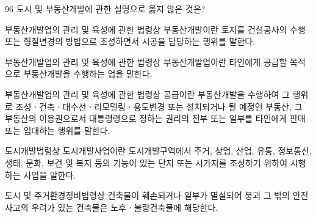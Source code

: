 \begin{question}{96}
도시 및 부동산개발에 관한 설명으로 옳지 않은 것은?
\begin{choices}
  \item 부동산개발업의 관리 및 육성에 관한 법령상 부동산개발이란 토지를 건설공사의 수행 또는 형질변경의 방법으로 조성하면서 시공을 담당하는 행위를 말한다.
  \item 부동산개발업의 관리 및 육성에 관한 법령상 부동산개발업이란 타인에게 공급할 목적으로 부동산개발을 수행하는 업을 말한다.
  \item 부동산개발업의 관리 및 육성에 관한 법령상 공급이란 부동산개발을 수행하여 그 행위로 조성ㆍ건축ㆍ대수선ㆍ리모델링ㆍ용도변경 또는 설치되거나 될 예정인 부동산, 그 부동산의 이용권으로서 대통령령으로 정하는 권리의 전부 또는 일부를 타인에게 판매 또는 임대하는 행위를 말한다.
  \item 도시개발법령상 도시개발사업이란 도시개발구역에서 주거, 상업, 산업, 유통, 정보통신, 생태, 문화, 보건 및 복지 등의 기능이 있는 단지 또는 시가지를 조성하기 위하여 시행하는 사업을 말한다.
  \item 도시 및 주거환경정비법령상 건축물이 훼손되거나 일부가 멸실되어 붕괴 그 밖의 안전사고의 우려가 있는 건축물은 노후ㆍ불량건축물에 해당한다.
\end{choices}
\end{question}
